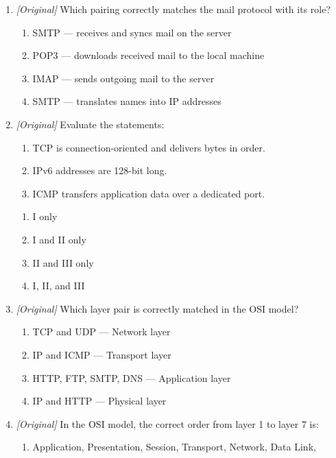 \documentclass[11pt]{article}
\begin{document}
\begin{enumerate}[label=\textbf{Q\arabic*.}, leftmargin=*]
\begin{enumerate}[label=\Alph*.]
    \item translate a domain name into an address.
  \end{enumerate}
\item \textit{[Original]} Which pairing correctly matches the mail protocol
  with its role?
  \begin{enumerate}[label=\Alph*.]
    \item SMTP --- receives and syncs mail on the server
    \item POP3 --- downloads received mail to the local machine
    \item IMAP --- sends outgoing mail to the server
    \item SMTP --- translates names into IP addresses
  \end{enumerate}
\item \textit{[Original]} Evaluate the statements:
  \begin{enumerate}[label=\Roman*.]
    \item TCP is connection-oriented and delivers bytes in order.
    \item IPv6 addresses are 128-bit long.
    \item ICMP transfers application data over a dedicated port.
  \end{enumerate}
  \begin{enumerate}[label=\Alph*.]
    \item I only
    \item I and II only
    \item II and III only
    \item I, II, and III
  \end{enumerate}
\item \textit{[Original]} Which layer pair is correctly matched in the OSI
  model?
  \begin{enumerate}[label=\Alph*.]
    \item TCP and UDP --- Network layer
    \item IP and ICMP --- Transport layer
    \item HTTP, FTP, SMTP, DNS --- Application layer
    \item IP and HTTP --- Physical layer
  \end{enumerate}
\item \textit{[Original]} In the OSI model, the correct order from layer 1 to
  layer 7 is:
  \begin{enumerate}[label=\Alph*.]
    \item Application, Presentation, Session, Transport, Network, Data Link,

\end{enumerate}
\end{enumerate}
\end{document}
